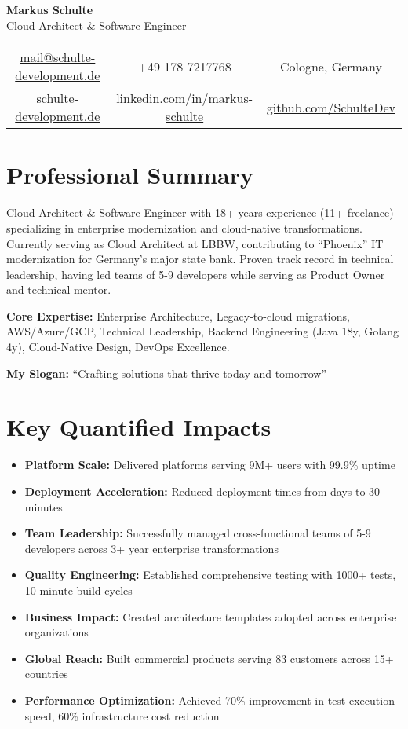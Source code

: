 \documentclass[11pt,a4paper]{article}
\begin{document}
\begin{center}
{\Huge\bfseries\color{primary}Markus Schulte}\\[0.5em]
{\large\color{secondary}Cloud Architect \& Software Engineer}\\[1em]
\begin{tabular}{c c c}
\href{mailto:mail@schulte-development.de}{mail@schulte-development.de} & 
+49 178 7217768 & 
Cologne, Germany \\
\href{https://schulte-development.de}{schulte-development.de} & 
\href{https://linkedin.com/in/markus-schulte}{linkedin.com/in/markus-schulte} & 
\href{https://github.com/SchulteDev}{github.com/SchulteDev}
\end{tabular}
\end{center}

\section{Professional Summary}
Cloud Architect \& Software Engineer with 18+ years experience (11+ freelance) specializing in enterprise modernization and cloud-native transformations. Currently serving as Cloud Architect at LBBW, contributing to ``Phoenix'' IT modernization for Germany's major state bank. Proven track record in technical leadership, having led teams of 5-9 developers while serving as Product Owner and technical mentor.

\textbf{Core Expertise:} Enterprise Architecture, Legacy-to-cloud migrations, AWS/Azure/GCP, Technical Leadership, Backend Engineering (Java 18y, Golang 4y), Cloud-Native Design, DevOps Excellence.

\textbf{My Slogan:} ``Crafting solutions that thrive today and tomorrow''

\section{Key Quantified Impacts}

\begin{itemize}[leftmargin=*,noitemsep,topsep=0pt]
\item \textbf{Platform Scale:} Delivered platforms serving 9M+ users with 99.9\% uptime
\item \textbf{Deployment Acceleration:} Reduced deployment times from days to 30 minutes
\item \textbf{Team Leadership:} Successfully managed cross-functional teams of 5-9 developers across 3+ year enterprise transformations
\item \textbf{Quality Engineering:} Established comprehensive testing with 1000+ tests, 10-minute build cycles
\item \textbf{Business Impact:} Created architecture templates adopted across enterprise organizations
\item \textbf{Global Reach:} Built commercial products serving 83 customers across 15+ countries
\item \textbf{Performance Optimization:} Achieved 70\% improvement in test execution speed, 60\% infrastructure cost reduction
\end{itemize}
\end{document}
